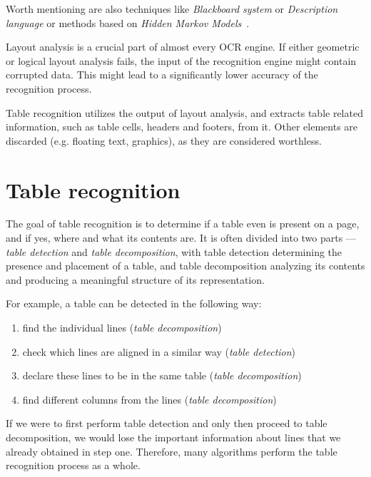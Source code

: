 Worth mentioning are also techniques like \emph{Blackboard system} or \emph{Description language} or methods based on \emph{Hidden Markov Models}~\cite{logicalLayoutOther}.

Layout analysis is a crucial part of almost every OCR engine. If either geometric or logical layout analysis fails, the input of the recognition engine might contain corrupted data. This might lead to a significantly lower accuracy of the recognition process. 

Table recognition utilizes the output of layout analysis, and extracts table related information, such as table cells, headers and footers, from it. Other elements are discarded (e.g. floating text, graphics), as they are considered worthless.

\section{Table recognition}

The goal of table recognition is to determine if a table even is present on a page, and if yes, where and what its contents are. It is often divided into two parts --- \emph{table detection} and \emph{table decomposition}, with table detection determining the presence and placement of a table, and table decomposition analyzing its contents and producing a meaningful structure of its representation.

 For example, a table can be detected in the following way:

\begin{enumerate}
    \item find the individual lines (\emph{table decomposition})
    \item check which lines are aligned in a similar way (\emph{table detection})
    \item declare these lines to be in the same table (\emph{table decomposition})
    \item find different columns from the lines (\emph{table decomposition})
\end{enumerate}

If we were to first perform table detection and only then proceed to table decomposition, we would lose the important information about lines that we already obtained in step one. Therefore, many algorithms perform the table recognition process as a whole. 

